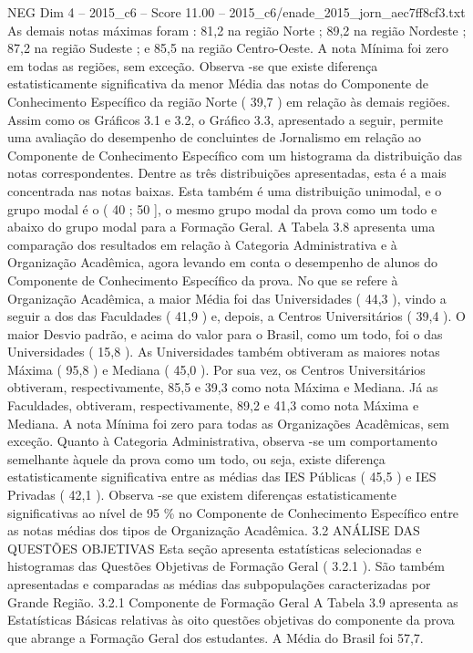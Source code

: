 \begin{textsample}{NEG Dim 4 – 2015\_c6 – Score 11.00 – 2015\_c6/enade\_2015\_jorn\_aec7ff8cf3.txt}
As demais notas máximas foram : 81,2 na região Norte ; 89,2 na região Nordeste ; 87,2 na região Sudeste ; e 85,5 na região Centro-Oeste.
A nota Mínima foi zero em todas as regiões, sem exceção.
Observa -se que existe diferença estatisticamente significativa da menor Média das notas do Componente de Conhecimento Específico da região Norte ( 39,7 ) em relação às demais regiões.
Assim como os Gráficos 3.1 e 3.2, o Gráfico 3.3, apresentado a seguir, permite uma avaliação do desempenho de concluintes de Jornalismo em relação ao Componente de Conhecimento Específico com um histograma da distribuição das notas correspondentes.
Dentre as três distribuições apresentadas, esta é a mais concentrada nas notas baixas.
Esta também é uma distribuição unimodal, e o grupo modal é o ( 40 ; 50 ], o mesmo grupo modal da prova como um todo e abaixo do grupo modal para a Formação Geral.
A Tabela 3.8 apresenta uma comparação dos resultados em relação à Categoria Administrativa e à Organização Acadêmica, agora levando em conta o desempenho de alunos do Componente de Conhecimento Específico da prova.
No que se refere à Organização Acadêmica, a maior Média foi das Universidades ( 44,3 ), vindo a seguir a dos das Faculdades ( 41,9 ) e, depois, a Centros Universitários ( 39,4 ).
O maior Desvio padrão, e acima do valor para o Brasil, como um todo, foi o das Universidades ( 15,8 ).
As Universidades também obtiveram as maiores notas Máxima ( 95,8 ) e Mediana ( 45,0 ).
Por sua vez, os Centros Universitários obtiveram, respectivamente, 85,5 e 39,3 como nota Máxima e Mediana.
Já as Faculdades, obtiveram, respectivamente, 89,2 e 41,3 como nota Máxima e Mediana.
A nota Mínima foi zero para todas as Organizações Acadêmicas, sem exceção.
Quanto à Categoria Administrativa, observa -se um comportamento semelhante àquele da prova como um todo, ou seja, existe diferença estatisticamente significativa entre as médias das IES Públicas ( 45,5 ) e IES Privadas ( 42,1 ).
Observa -se que existem diferenças estatisticamente significativas ao nível de 95 \% no Componente de Conhecimento Específico entre as notas médias dos tipos de Organização Acadêmica. 3.2 ANÁLISE DAS QUESTÕES OBJETIVAS Esta seção apresenta estatísticas selecionadas e histogramas das Questões Objetivas de Formação Geral ( 3.2.1 ).
São também apresentadas e comparadas as médias das subpopulações caracterizadas por Grande Região. 3.2.1 Componente de Formação Geral A Tabela 3.9 apresenta as Estatísticas Básicas relativas às oito questões objetivas do componente da prova que abrange a Formação Geral dos estudantes.
A Média do Brasil foi 57,7.

\end{textsample}
